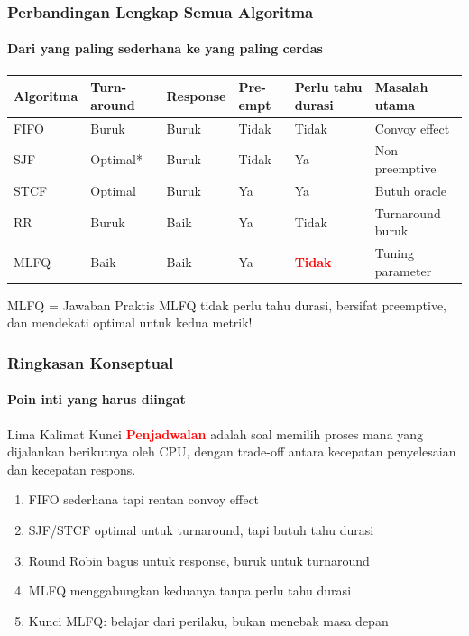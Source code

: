\documentclass[t,aspectratio=169,xcolor=dvipsnames]{beamer}
\newcommand{\tem}[1]{\textbf{\textcolor{red}{#1}}}
\begin{document}
\begin{frame}
    \frametitle{Perbandingan Lengkap Semua Algoritma}
    \framesubtitle{Dari yang paling sederhana ke yang paling cerdas}
    \scriptsize
    \begin{tabular}{|p{}|p{}|p{}|p{}|p{}|p{}|}
        \hline
        \textbf{Algoritma} & \textbf{Turn-around} & \textbf{Response} & \textbf{Pre-empt} & \textbf{Perlu tahu durasi} & \textbf{Masalah utama} \\
        \hline
        FIFO & Buruk & Buruk & Tidak & Tidak & Convoy effect \\
        \hline
        SJF & Optimal* & Buruk & Tidak & Ya & Non-preemptive \\
        \hline
        STCF & Optimal & Buruk & Ya & Ya & Butuh oracle \\
        \hline
        RR & Buruk & Baik & Ya & Tidak & Turnaround buruk \\
        \hline
        MLFQ & Baik & Baik & Ya & \tem{Tidak} & Tuning parameter \\
        \hline
    \end{tabular}

    \vspace{0.1cm}
    \begin{exampleblock}{MLFQ = Jawaban Praktis}
        MLFQ tidak perlu tahu durasi, bersifat preemptive, dan mendekati optimal untuk kedua metrik!
    \end{exampleblock}
\end{frame}

\begin{frame}
    \frametitle{Ringkasan Konseptual}
    \framesubtitle{Poin inti yang harus diingat}
    \begin{alertblock}{Lima Kalimat Kunci}
        \tem{Penjadwalan} adalah soal memilih proses mana yang dijalankan berikutnya oleh CPU, dengan trade-off antara kecepatan penyelesaian dan kecepatan respons.
    \end{alertblock}
    \vspace{0.1cm}
    \small
    \begin{enumerate}
        \item FIFO sederhana tapi rentan convoy effect
        \item SJF/STCF optimal untuk turnaround, tapi butuh tahu durasi
        \item Round Robin bagus untuk response, buruk untuk turnaround
        \item MLFQ menggabungkan keduanya tanpa perlu tahu durasi
        \item Kunci MLFQ: belajar dari perilaku, bukan menebak masa depan
    \end{enumerate}
\end{frame}
\end{document}
